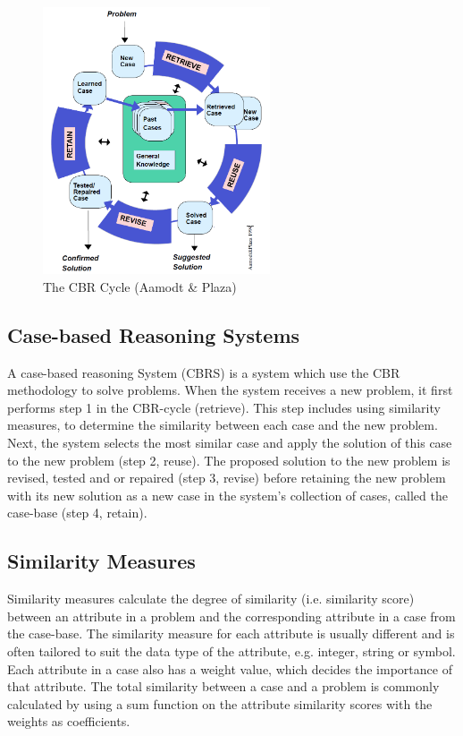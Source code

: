 \begin{figure}[h]
    \centering
    \includegraphics[width=0.6\textwidth]{fig/cbr-cycle.png}
    \caption[The CBR Cycle]{The CBR Cycle (Aamodt \& Plaza) \cite{aamodt1994case}}
    \label{fig:cbr_cycle}
\end{figure}

\subsection{Case-based Reasoning Systems}

A case-based reasoning System (CBRS) is a system which use the CBR methodology to solve problems. When the system receives a new problem, it first performs step 1 in the CBR-cycle (retrieve). This step includes using similarity measures, to determine the similarity between each case and the new problem. Next, the system selects the most similar case and apply the solution of this case to the new problem (step 2, reuse). The proposed solution to the new problem is revised, tested and or repaired (step 3, revise) before retaining the new problem with its new solution as a new case in the system's collection of cases, called the case-base (step 4, retain).

\subsection{Similarity Measures}

Similarity measures calculate the degree of similarity (i.e. similarity score) between an attribute in a problem and the corresponding attribute in a case from the case-base. The similarity measure for each attribute is usually different and is often tailored to suit the data type of the attribute, e.g. integer, string or symbol. Each attribute in a case also has a weight value, which decides the importance of that attribute. The total similarity between a case and a problem is commonly calculated by using a sum function on the attribute similarity scores with the weights as coefficients.

